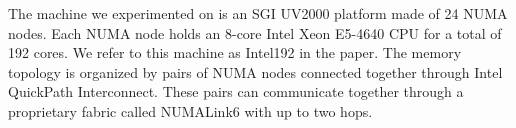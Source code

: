 \documentclass{Styles/llncs}
\newcommand{\TG}[1]{{\color{red}\bfseries TG: #1}}
\begin{document}
The machine we experimented on is an SGI UV2000 platform made of 24 NUMA nodes.
Each NUMA node holds an 8-core Intel Xeon E5-4640 CPU for a total of 192 cores.
We refer to this machine as Intel192 in the paper. 
%
%
%
%
%
%
%
%
The memory topology is organized by pairs of NUMA nodes connected together through Intel QuickPath Interconnect.
These pairs can communicate together through a proprietary fabric called NUMALink6 with up to two hops.
\end{document}
